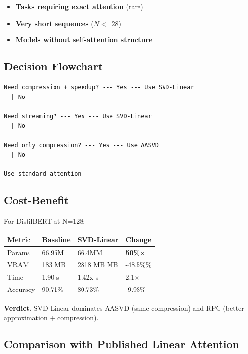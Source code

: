 \begin{itemize}
\item \textbf{Tasks requiring exact attention} (rare)
\item \textbf{Very short sequences} ($N < 128$)
\item \textbf{Models without self-attention structure}

\end{itemize}
\subsection{Decision Flowchart}

\begin{lstlisting}
Need compression + speedup? --- Yes --- Use SVD-Linear
  | No
   
Need streaming? --- Yes --- Use SVD-Linear
  | No
   
Need only compression? --- Yes --- Use AASVD
  | No
   
Use standard attention
\end{lstlisting}

\subsection{Cost-Benefit}

For DistilBERT at N=128:

\begin{table}[H]
\centering
\small
\begin{tabular}{llll}
\toprule
\textbf{Metric} & \textbf{Baseline} & \textbf{SVD-Linear} & \textbf{Change} \\
\midrule
Params & 66.95M & 66.4MM & \textbf{50\%$\times$} \\
VRAM & 183 MB & 2818 MB MB & -48.5\%\% \\
Time & 1.90 s & 1.42x s & 2.1$\times$ \\
Accuracy & 90.71\% & 80.73\% & -9.98\% \\
\bottomrule
\end{tabular}
\end{table}

\textbf{Verdict.} SVD-Linear dominates AASVD (same compression) and RPC (better 
approximation + compression).

\subsection{Comparison with Published Linear Attention}

